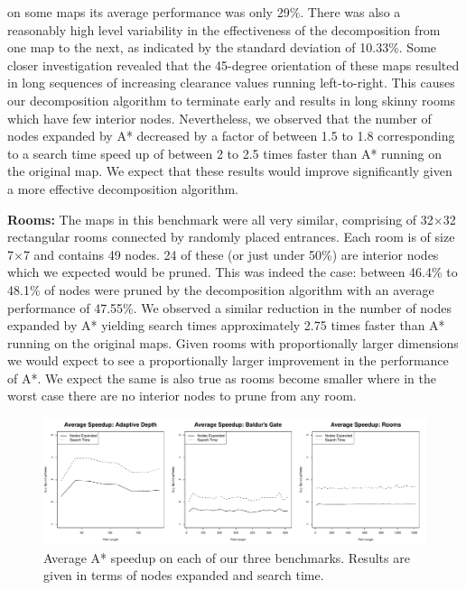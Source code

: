 on some maps its average performance was only 29\%. 
There was also a reasonably high level variability in the effectiveness of the 
decomposition from one map to the next, as indicated by the standard deviation
of 10.33\%.
Some closer investigation revealed that the 45-degree orientation of these maps
resulted in long sequences of increasing clearance values running left-to-right.
This causes our decomposition algorithm to terminate early and results in long
skinny rooms which have few interior nodes.
Nevertheless, we observed that the number of nodes expanded by A* decreased by a
factor of between 1.5 to 1.8 corresponding to a search time speed up of between
2 to 2.5 times faster than A* running on the original map.
We expect that these results would improve significantly given a more effective
decomposition algorithm.
\par
\textbf{Rooms:}
The maps in this benchmark were all very similar, comprising of 32$\times$32
rectangular rooms connected by randomly placed entrances.
Each room is of size 7$\times$7 and contains 49 nodes. 
24 of these (or just under 50\%) are interior nodes which we expected would be
pruned.
This was indeed the case: between 46.4\% to 48.1\% of nodes were pruned by 
the decomposition algorithm with an average performance of 47.55\%.
We observed a similar reduction in the number of nodes expanded by A* yielding
search times approximately 2.75 times faster than A* running on the original
maps.
Given rooms with proportionally larger dimensions we would expect to see a
proportionally larger improvement in the performance of A*.
We expect the same is also true as rooms become smaller where in the worst case
there are no interior nodes to prune from any room.

\begin{figure}[t]
       \begin{center}
                       \includegraphics[width=1.95\columnwidth, trim = 10mm 10mm 10mm 0mm]{diagrams/speedup.pdf}
       \end{center}
       \caption{Average A* speedup on each of our three benchmarks. 
		Results are given in terms of nodes expanded and search time.}
\label{fig-speedup}
\end{figure}
